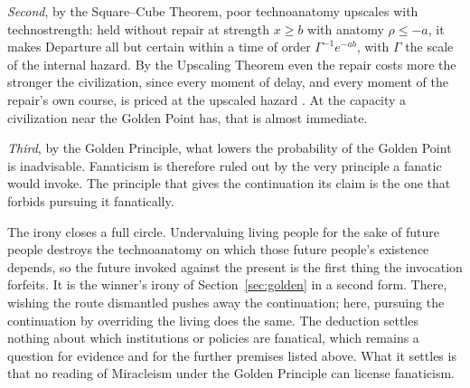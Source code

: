 \emph{Second}, by the Square--Cube Theorem, poor technoanatomy upscales with
technostrength: held without repair at strength $x\ge b$ with anatomy
$\rho\le-a$, it makes Departure all but certain within a time of order
$\Gamma^{-1}e^{-ab}$, with $\Gamma$ the scale of the internal hazard. By the
Upscaling Theorem even the repair costs more the stronger the civilization,
since every moment of delay, and every moment of the repair's own course, is
priced at the upscaled hazard \cite{GoldenTechnoanatomy}. At the capacity a
civilization near the Golden Point has, that is almost immediate.

\emph{Third}, by the Golden Principle, what lowers the probability of the
Golden Point is inadvisable. Fanaticism is therefore ruled out by the very
principle a fanatic would invoke. The principle that gives the continuation
its claim is the one that forbids pursuing it fanatically.

The irony closes a full circle. Undervaluing living people for the sake of
future people destroys the technoanatomy on which those future people's
existence depends, so the future invoked against the present is the first
thing the invocation forfeits. It is the winner's irony of
Section~\ref{sec:golden} in a second form. There, wishing the route
dismantled pushes away the continuation; here, pursuing the continuation by
overriding the living does the same. The deduction settles nothing about
which institutions or policies are fanatical, which remains a question for
evidence and for the further premises listed above. What it
settles is that no reading of Miracleism under the Golden Principle can
license fanaticism.

